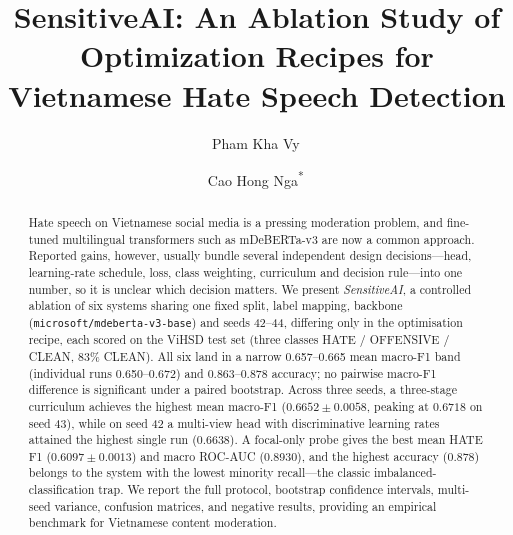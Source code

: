 \documentclass[a4paper,runningheads]{llncs}
\begin{document}
\title{SensitiveAI: An Ablation Study of Optimization Recipes
       for Vietnamese Hate Speech Detection}

\author{
Pham Kha Vy\, \and
Cao Hong Nga\textsuperscript{*}\,
}




\maketitle

\begin{abstract}
Hate speech on Vietnamese social media is a pressing moderation problem, and
fine-tuned multilingual transformers such as mDeBERTa-v3 are now a common
approach.  Reported gains, however, usually bundle several independent design
decisions---head, learning-rate schedule, loss, class weighting, curriculum and
decision rule---into one number, so it is unclear which decision matters.  We
present \emph{SensitiveAI}, a controlled ablation of six systems sharing one fixed
split, label mapping, backbone (\texttt{microsoft/mdeberta-v3-base}) and seeds
42--44, differing only in the optimisation recipe, each scored on the ViHSD test set
(three classes HATE / OFFENSIVE / CLEAN, 83\% CLEAN).  All six land in a narrow
0.657--0.665 mean macro-F1 band (individual runs 0.650--0.672) and 0.863--0.878
accuracy; no pairwise macro-F1 difference is significant under a paired bootstrap.
Across three seeds, a three-stage curriculum achieves the highest mean macro-F1
($0.6652 \pm 0.0058$, peaking at $0.6718$ on seed 43), while on seed 42 a multi-view
head with discriminative learning rates attained the highest single run (0.6638).
A focal-only probe gives the best mean HATE F1 ($0.6097 \pm 0.0013$) and macro
ROC-AUC (0.8930), and the highest accuracy (0.878) belongs to the system with the
lowest minority recall---the classic imbalanced-classification trap.  We report
the full protocol, bootstrap confidence intervals, multi-seed variance, confusion
matrices, and negative results, providing an empirical benchmark for Vietnamese
content moderation.
\end{abstract}













{\let\small\scriptsize}
\end{document}
